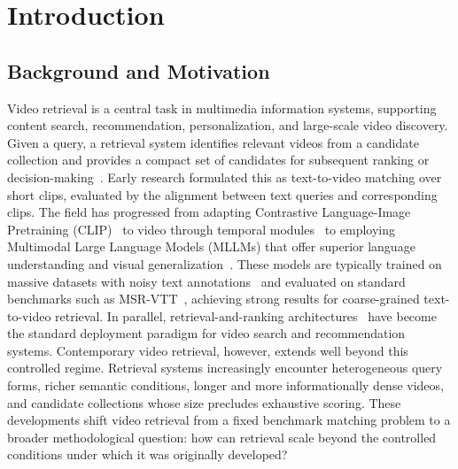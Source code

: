 \chapter{Introduction}\label{ch:introduction}

\section{Background and Motivation}\label{sec:intro-background}

Video retrieval is a central task in multimedia information systems, supporting content search, recommendation, personalization, and large-scale video discovery. Given a query, a retrieval system identifies relevant videos from a candidate collection and provides a compact set of candidates for subsequent ranking or decision-making~\cite{zhu2023deep}. Early research formulated this as text-to-video matching over short clips, evaluated by the alignment between text queries and corresponding clips. The field has progressed from adapting Contrastive Language-Image Pretraining (CLIP)~\cite{radford2021learning} to video through temporal modules~\cite{luo2022clip4clip} to employing Multimodal Large Language Models (MLLMs) that offer superior language understanding and visual generalization~\cite{kong2025modality}. These models are typically trained on massive datasets with noisy text annotations~\cite{bain2021frozen} and evaluated on standard benchmarks such as MSR-VTT~\cite{xu2016msr}, achieving strong results for coarse-grained text-to-video retrieval. In parallel, retrieval-and-ranking architectures~\cite{cheng2016wide,covington2016deep} have become the standard deployment paradigm for video search and recommendation systems. Contemporary video retrieval, however, extends well beyond this controlled regime. Retrieval systems increasingly encounter heterogeneous query forms, richer semantic conditions, longer and more informationally dense videos, and candidate collections whose size precludes exhaustive scoring. These developments shift video retrieval from a fixed benchmark matching problem to a broader methodological question: how can retrieval scale beyond the controlled conditions under which it was originally developed?

